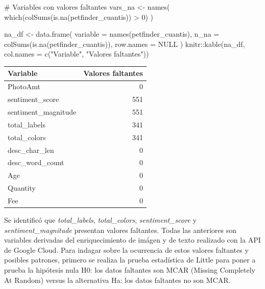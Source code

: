 \documentclass[
  spanish,
  letterpaper,
  DIV=11,
  numbers=noendperiod]{scrartcl}
\newenvironment{Shaded}{\begin{snugshade}}{\end{snugshade}}
\newcommand{\AttributeTok}[1]{\textcolor[rgb]{0.40,0.45,0.13}{#1}}
\newcommand{\CommentTok}[1]{\textcolor[rgb]{0.37,0.37,0.37}{#1}}
\newcommand{\ConstantTok}[1]{\textcolor[rgb]{0.56,0.35,0.01}{#1}}
\newcommand{\DecValTok}[1]{\textcolor[rgb]{0.68,0.00,0.00}{#1}}
\newcommand{\FunctionTok}[1]{\textcolor[rgb]{0.28,0.35,0.67}{#1}}
\newcommand{\NormalTok}[1]{\textcolor[rgb]{0.00,0.23,0.31}{#1}}
\newcommand{\OtherTok}[1]{\textcolor[rgb]{0.00,0.23,0.31}{#1}}
\newcommand{\SpecialCharTok}[1]{\textcolor[rgb]{0.37,0.37,0.37}{#1}}
\newcommand{\StringTok}[1]{\textcolor[rgb]{0.13,0.47,0.30}{#1}}
\newcounter{none} %
\begin{document}
\begin{Shaded}
\begin{Highlighting}[]
\CommentTok{\# Variables con valores faltantes}
\NormalTok{vars\_na }\OtherTok{\textless{}{-}} \FunctionTok{names}\NormalTok{(}
  \FunctionTok{which}\NormalTok{(}\FunctionTok{colSums}\NormalTok{(}\FunctionTok{is.na}\NormalTok{(petfinder\_cuantis)) }\SpecialCharTok{\textgreater{}} \DecValTok{0}\NormalTok{)}
\NormalTok{)}

\NormalTok{na\_df }\OtherTok{\textless{}{-}} \FunctionTok{data.frame}\NormalTok{(}
  \AttributeTok{variable =} \FunctionTok{names}\NormalTok{(petfinder\_cuantis),}
  \AttributeTok{n\_na     =} \FunctionTok{colSums}\NormalTok{(}\FunctionTok{is.na}\NormalTok{(petfinder\_cuantis)),}
  \AttributeTok{row.names =} \ConstantTok{NULL}
\NormalTok{)}
\NormalTok{knitr}\SpecialCharTok{::}\FunctionTok{kable}\NormalTok{(na\_df, }\AttributeTok{col.names =} \FunctionTok{c}\NormalTok{(}\StringTok{"Variable"}\NormalTok{, }\StringTok{"Valores faltantes"}\NormalTok{))}
\end{Highlighting}
\end{Shaded}

{\def\LTcaptype{none} %
\begin{longtable}[]{@{}lr@{}}
\toprule\noalign{}
Variable & Valores faltantes \\
\midrule\noalign{}
\endhead
\bottomrule\noalign{}
\endlastfoot
PhotoAmt & 0 \\
sentiment\_score & 551 \\
sentiment\_magnitude & 551 \\
total\_labels & 341 \\
total\_colors & 341 \\
desc\_char\_len & 0 \\
desc\_word\_count & 0 \\
Age & 0 \\
Quantity & 0 \\
Fee & 0 \\
\end{longtable}
}

Se identificó que \emph{total\_labels}, \emph{total\_colors},
\emph{sentiment\_score} y \emph{sentiment\_magnitude} presentan valores
faltantes. Todas las anteriores son variables derivadas del
enriquecimiento de imágen y de texto realizado con la API de Google
Cloud. Para indagar sobre la ocurrencia de estos valores faltantes y
posibles patrones, primero se realiza la prueba estadística de Little
para poner a prueba la hipótesis nula H0: los datos faltantes son MCAR
(Missing Completely At Random) versus la alternativa Ha: los datos
faltantes no son MCAR.
\end{document}
